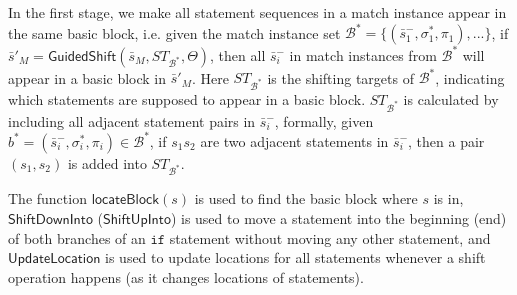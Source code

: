\documentclass[letterpaper, USenglish]{lipics-v2016}
\theoremstyle{plain}
\begin{document}
In the first stage, we
make all statement sequences 
in a match instance appear in the same basic block, i.e. given the match
instance set $\mathcal{B}^*=\{(\bar{s}_1^-,\sigma_1^*,\pi_1),...\}$,
if $\bar{s}'_M=\mathsf{GuidedShift}(\bar{s}_M,
\mathit{ST}_{\mathcal{B}^*}, \Theta)$, then all $\bar{s}^-_i$ in match
instances from $\mathcal{B}^*$ will appear in a basic block in
$\bar{s}'_M$. Here ${ST}_{\mathcal{B}^*}$ is the shifting targets of $\mathcal{B}^*$, indicating which statements are supposed to appear in a basic block. ${ST}_{\mathcal{B}^*}$ is calculated by including all adjacent statement pairs in $\bar{s}^-_i$, formally, given $b^*=(\bar{s}_i^-,\sigma_i^*,\pi_i)\in \mathcal{B}^*$, if $s_1s_2$ are two adjacent statements in $\bar{s}^-_i$, then a pair $(s_1,s_2)$ is added into $\mathit{ST}_{\mathcal{B}^{*}}$.

The function $\mathsf{locateBlock}(s)$ is used to find the basic block
where $s$ is in, $\mathsf{ShiftDownInto}$ ($\mathsf{ShiftUpInto}$) is
used to move a statement into the beginning (end) of both branches of an $\mathtt{if}$ statement
without moving any other statement, and $\mathsf{UpdateLocation}$ is used to update locations for all statements whenever a shift operation happens (as it changes locations of statements).
\end{document}

